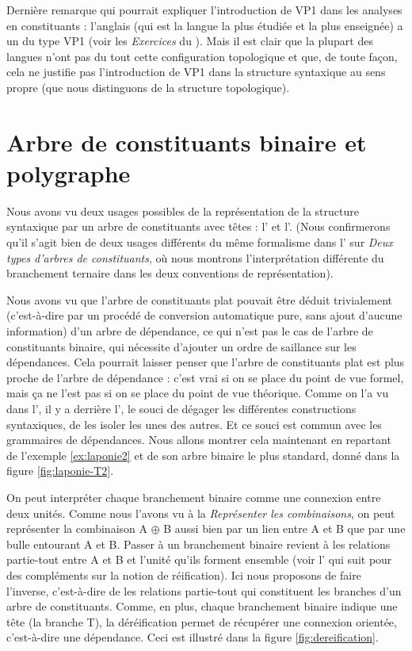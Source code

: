 {    Dernière remarque qui pourrait expliquer l’introduction de VP1 dans les analyses en constituants : l’anglais (qui est la langue la plus étudiée et la plus enseignée) a un  du type VP1 (voir les \textit{Exercices} du ). Mais il est clair que la plupart des langues n’ont pas du tout cette configuration topologique et que, de toute façon, cela ne justifie pas l’introduction de VP1 dans la structure syntaxique au sens propre (que nous distinguons de la structure topologique).
}
\section{Arbre de constituants binaire et polygraphe}\label{sec:3.4.21}

Nous avons vu deux usages possibles de la représentation de la structure syntaxique par un arbre de constituants avec têtes : l’ et l’. (Nous confirmerons qu’il s’agit bien de deux usages différents du même formalisme dans l’ sur \textit{Deux types d’arbres de constituants}, où nous montrons l’interprétation différente du branchement ternaire dans les deux conventions de représentation).

Nous avons vu que l’arbre de constituants plat pouvait être déduit trivialement (c’est-à-dire par un procédé de conversion automatique pure, sans ajout d’aucune information) d’un arbre de dépendance, ce qui n’est pas le cas de l’arbre de constituants binaire, qui nécessite d’ajouter un ordre de saillance sur les dépendances. Cela pourrait laisser penser que l’arbre de constituants plat est plus proche de l’arbre de dépendance : c’est vrai si on se place du point de vue formel, mais ça ne l’est pas si on se place du point de vue théorique. Comme on l’a vu dans l', il y a derrière l’, le souci de dégager les différentes constructions syntaxiques, de les isoler les unes des autres. Et ce souci est commun avec les grammaires de dépendances. Nous allons montrer cela maintenant en repartant de l'exemple \ref{ex:laponie2} et de son arbre binaire le plus standard, donné dans la figure \ref{fig:laponie-T2}.

On peut interpréter chaque branchement binaire comme une connexion entre deux unités. Comme nous l’avons vu à la  \textit{Représenter les combinaisons}, on peut représenter la combinaison A ${\oplus}$ B aussi bien par un lien entre A et B que par une bulle entourant A et B. Passer à un branchement binaire revient à  les relations partie-tout entre A et B et l’unité qu’ils forment ensemble (voir l’ qui suit pour des compléments sur la notion de réification). Ici nous proposons de faire l’inverse, c’est-à-dire de  les relations partie-tout qui constituent les branches d’un arbre de constituants. Comme, en plus, chaque branchement binaire indique une tête (la branche T), la déréification permet de récupérer une connexion orientée, c’est-à-dire une dépendance. Ceci est illustré dans la figure \ref{fig:dereification}.

